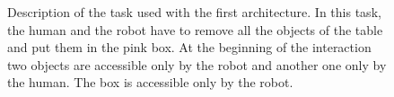 \documentclass[english,a4paper,11pt,twoside]{StyleThese}
\begin{document}
\begin{figure}[!h]
\centering
    \caption{Description of the task used with the first architecture. In this task, the human and the robot have to remove all the objects of the table and put them in the pink box. At the beginning of the interaction two objects are accessible only by the robot and another one only by the human. The box is accessible only by the robot.}
    \label{fig:firstTask}
\end{figure}
\end{document}
